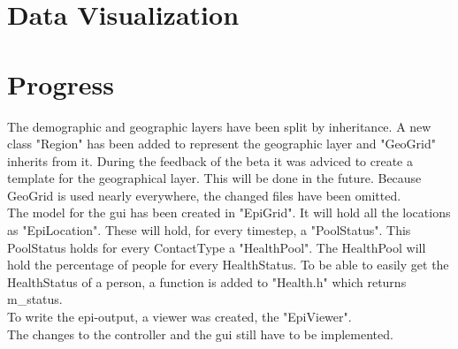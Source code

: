 \documentclass[runningheads]{llncs}
\begin{document}
\section{Data Visualization}
\section{Progress}
The demographic and geographic layers have been split by inheritance. A new class "Region" has been added to represent the geographic layer and "GeoGrid" inherits from it. During the feedback of the beta it was adviced to create a template for the geographical layer. This will be done in the future. Because GeoGrid is used nearly everywhere, the changed files have been omitted. \\
The model for the gui has been created in "EpiGrid". It will hold all the locations as "EpiLocation". These will hold, for every timestep, a "PoolStatus". This PoolStatus holds for every
ContactType a "HealthPool". The HealthPool will hold the percentage of people for every HealthStatus. To be able to easily get the HealthStatus of a person, a function is added to "Health.h" which returns m\_status.\\
To write the epi-output, a viewer was created, the "EpiViewer".\\
The changes to the controller and the gui still have to be implemented.
\end{document}
